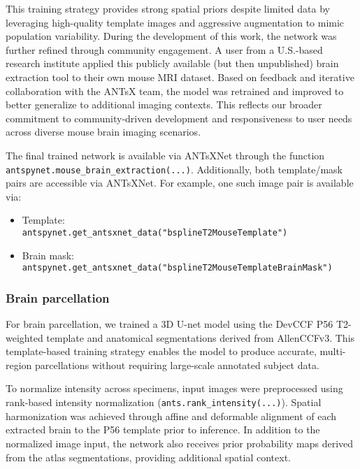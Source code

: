 \documentclass[
  12pt,
]{article}
\providecommand{\tightlist}{%
  \setlength{\itemsep}{0pt}\setlength{\parskip}{0pt}}
\begin{document}
This training strategy provides strong spatial priors despite limited
data by leveraging high-quality template images and aggressive
augmentation to mimic population variability. During the development of
this work, the network was further refined through community engagement.
A user from a U.S.-based research institute applied this publicly
available (but then unpublished) brain extraction tool to their own
mouse MRI dataset. Based on feedback and iterative collaboration with
the ANTsX team, the model was retrained and improved to better
generalize to additional imaging contexts. This reflects our broader
commitment to community-driven development and responsiveness to user
needs across diverse mouse brain imaging scenarios.

The final trained network is available via ANTsXNet through the
function\\
\texttt{antspynet.mouse\_brain\_extraction(...)}. Additionally, both
template/mask pairs are accessible via ANTsXNet. For example, one such
image pair is available via:

\begin{itemize}
\tightlist
\item
  Template:\\
  \texttt{antspynet.get\_antsxnet\_data("bsplineT2MouseTemplate")}
\item
  Brain mask:\\
  \texttt{antspynet.get\_antsxnet\_data("bsplineT2MouseTemplateBrainMask")}
\end{itemize}

\subsubsection{Brain parcellation}\label{brain-parcellation}

For brain parcellation, we trained a 3D U-net model using the DevCCF P56
T2-weighted template and anatomical segmentations derived from
AllenCCFv3. This template-based training strategy enables the model to
produce accurate, multi-region parcellations without requiring
large-scale annotated subject data.

To normalize intensity across specimens, input images were preprocessed
using rank-based intensity normalization
(\texttt{ants.rank\_intensity(...)}). Spatial harmonization was achieved
through affine and deformable alignment of each extracted brain to the
P56 template prior to inference. In addition to the normalized image
input, the network also receives prior probability maps derived from the
atlas segmentations, providing additional spatial context.
\end{document}
